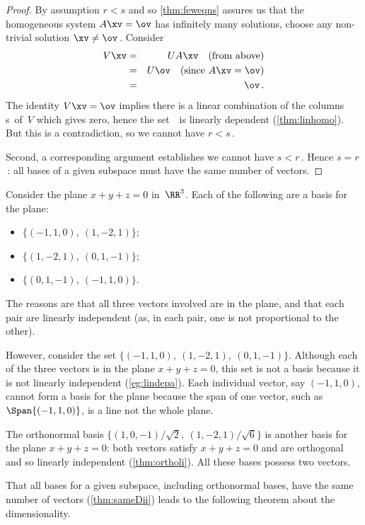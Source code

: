 \begin{proof}
By assumption \(r<s\) and so \autoref{thm:feweqns} assures us that the homogeneous system \(A\xv=\ov\) has infinitely many solutions, choose any non-trivial solution \(\xv\neq\ov\)\,.
Consider 
\begin{eqnarray*}
V\xv&=& UA\xv\quad(\text{from above})
\\&=&U\ov\quad(\text{since }A\xv=\ov)
\\&=&\ov\,.
\end{eqnarray*}
The identity \(V\xv=\ov\) implies there is a linear combination of the columns \hlist\vv s\ of~\(V\) which gives zero, hence the set~\cV\ is linearly dependent (\autoref{thm:linhomo}).  
But this is a contradiction, so we cannot have \(r<s\)\,.

Second, a corresponding argument establishes we cannot have \(s<r\)\,.
Hence \(s=r\)\,: all bases of a given subspace must have the same number of vectors.
\end{proof}



\begin{example} \label{eg:samedi}
Consider the plane \(x+y+z=0\) in~\(\RR^3\).
Each of the following are a basis for the plane:
\begin{itemize}
\item \(\{(-1,1,0),\ (1,-2,1)\}\);
\item \(\{(1,-2,1),\ (0,1,-1)\}\); 
\item \(\{(0,1,-1),\ (-1,1,0)\}\).
\end{itemize}
The reasons are that all three vectors involved are in the plane, and that each pair are linearly independent (as, in each pair, one is not proportional to the other).

However, consider the set \(\{(-1,1,0),\ (1,-2,1),\ (0,1,-1)\}\).
Although each of the three vectors is in the plane \(x+y+z=0\), this set is not a basis because it is not linearly independent (\autoref{eg:lindepa}).
Each individual vector, say \((-1,1,0)\), cannot form a basis for the plane because the span of one vector, such as \(\Span\{(-1,1,0)\}\), is a line not the whole plane.

The orthonormal basis \(\big\{(1,0,-1)/\sqrt2,\ (1,-2,1)/\sqrt6\big\}\) is another basis for the plane \(x+y+z=0\): both vectors satisfy \(x+y+z=0\) and are orthogonal and so linearly independent (\autoref{thm:ortholi}).  
All these bases possess two vectors.
\end{example}

That all bases for a given subspace, including orthonormal bases, have the same number of vectors (\autoref{thm:sameDii}) leads to the following theorem about the dimensionality.

